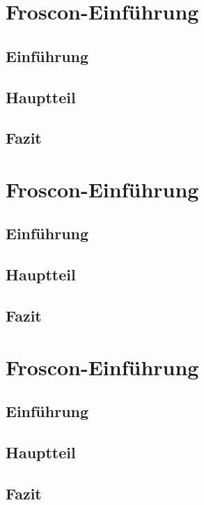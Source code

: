 \documentclass[ngerman]{scrbook}
\begin{document}
\blindtext[125]


\chapter{Froscon-Einführung}

\section{Einführung}

\blindtext[25]

\section{Hauptteil}

\blindtext[25]


\section{Fazit}

\blindtext[25]


\chapter{Froscon-Einführung}

\section{Einführung}

\blindtext[25]

\section{Hauptteil}

\blindtext[25]


\section{Fazit}

\blindtext[25]


\chapter{Froscon-Einführung}

\section{Einführung}

\blindtext[25]

\section{Hauptteil}

\blindtext[25]


\section{Fazit}

\blindtext[25]
\end{document}
